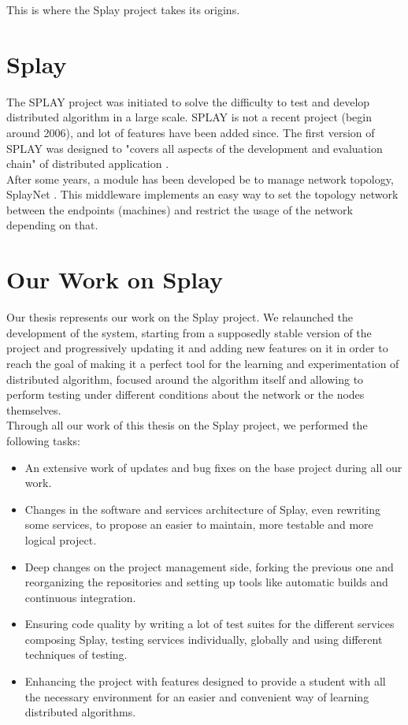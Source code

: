 \documentclass{eplmastersthesis}
\begin{document}
      This is where the Splay project takes its origins.

    \section{Splay}

      The SPLAY project was initiated to solve the difficulty to test and
      develop distributed algorithm in a large scale. SPLAY is not a recent
      project (begin around 2006), and lot of features have been added since.
      The first version of SPLAY was designed to "covers all aspects of the
      development and evaluation chain" of distributed application
      \cite{SPLAY}. \\

      After some years, a module has been developed be to manage network
      topology, SplayNet \cite{SplayNet}. This middleware implements an easy
      way to set the topology network between the endpoints (machines) and
      restrict the usage of the network depending on that.

    \section{Our Work on Splay}

      Our thesis represents our work on the Splay project. We relaunched
      the development of the system, starting from a supposedly stable
      version of the project and progressively updating it and adding new
      features on it in order to reach the goal of making it a perfect
      tool for the learning and experimentation of distributed algorithm,
      focused around the algorithm itself and allowing to perform testing
      under different conditions about the network or the nodes themselves.\\

      Through all our work of this thesis on the Splay project, we performed
      the following tasks:

      \begin{itemize}
        \item An extensive work of updates and bug fixes on the base project
        during all our work.
        \item Changes in the software and services architecture of Splay,
        even rewriting some services, to propose an easier to maintain, more
        testable and more logical project.
        \item Deep changes on the project management side, forking the
        previous one and reorganizing the repositories and setting up tools
        like automatic builds and continuous integration.
        \item Ensuring code quality by writing a lot of test suites for the
        different services composing Splay, testing services individually,
        globally and using different techniques of testing.
        \item Enhancing the project with features designed to provide a
        student with all the necessary environment for an easier and convenient
        way of learning distributed algorithms.
      \end{itemize}
\end{document}
